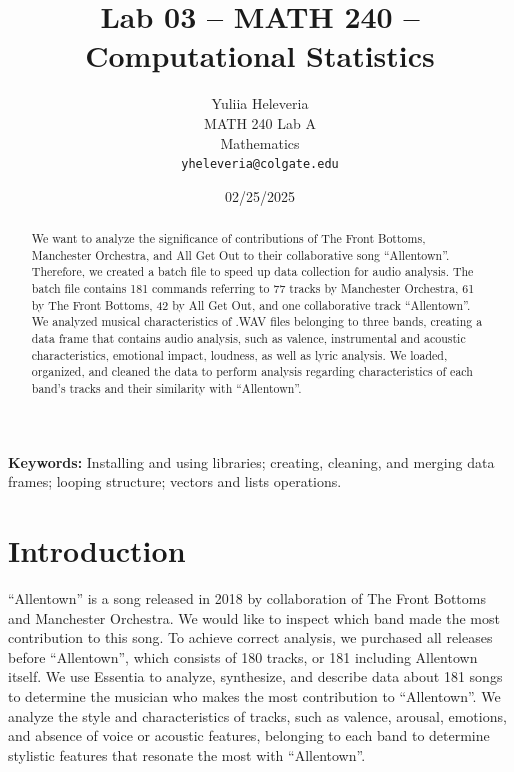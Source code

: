 \documentclass{article}\usepackage[]{graphicx}\usepackage[]{xcolor}
\begin{document}
\vspace{-1in}
\title{Lab 03 -- MATH 240 -- Computational Statistics}

\author{
  Yuliia Heleveria \\
  MATH 240 Lab A  \\
  Mathematics  \\
  {\tt yheleveria@colgate.edu}
}

\date{02/25/2025}

\maketitle

\begin{multicols}{2}
\begin{abstract}
We want to analyze the significance of contributions of The Front Bottoms, Manchester Orchestra, and All Get Out to their collaborative song ``Allentown''. Therefore, we created a batch file to speed up data collection for audio analysis. The batch file contains 181 commands referring to 77 tracks by Manchester Orchestra, 61 by The Front Bottoms, 42 by All Get Out, and one collaborative track ``Allentown''. We analyzed musical characteristics of .WAV files belonging to three bands, creating a data frame that contains audio analysis, such as valence, instrumental and acoustic characteristics, emotional impact, loudness, as well as lyric analysis. We loaded, organized, and cleaned the data to perform analysis regarding characteristics of each band's tracks and their similarity with ``Allentown''. 
\end{abstract}

\noindent \textbf{Keywords:} Installing and using libraries; creating, cleaning, and merging data frames; looping structure; vectors and lists operations.

\section{Introduction}
``Allentown'' is a song released in 2018 by collaboration of The Front Bottoms and Manchester Orchestra. We would like to inspect which band made the most contribution to this song. To achieve correct analysis, we purchased all releases before ``Allentown'', which consists of 180 tracks, or 181 including Allentown itself.
We use Essentia \citep{bogdanov2013essentia} to analyze, synthesize, and describe data about 181 songs to determine the musician who makes the most contribution to ``Allentown''. We analyze the style and characteristics of tracks, such as valence, arousal, emotions, and absence of voice or acoustic features, belonging to each band to determine stylistic features that resonate the most with ``Allentown''. 


\end{multicols}
\end{document}
